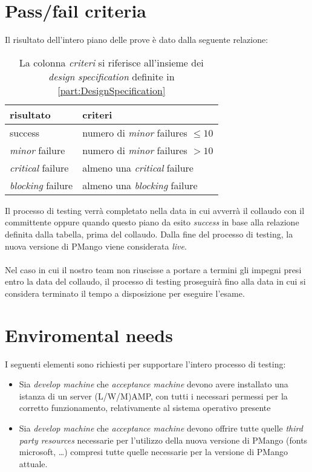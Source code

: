 \section{Pass/fail criteria}
Il risultato dell'intero piano delle prove \`e dato dalla seguente relazione:
\begin{table}[h!]
  \begin{center}
    \begin{tabular}{| l | l |}
    \hline
    \textbf{risultato} & \textbf{criteri} \\
	\hline    
	success & numero di \emph{minor} failures $\leq 10$   \\
    \hline
    \emph{minor} failure & numero di \emph{minor} failures $> 10$ \\
    \hline
    \emph{critical} failure & almeno una \emph{critical} failure \\
    \hline
    \emph{blocking} failure & almeno una \emph{blocking} failure \\
    \hline
    \end{tabular}
  \end{center}
	\caption{La colonna \emph{criteri} si riferisce all'insieme dei \emph{design
	specification} definite in \ref{part:DesignSpecification}}
\end{table}

Il processo di testing verr\`a completato nella data in cui avverr\`a il
collaudo con il committente oppure quando questo piano da esito
\emph{success} in base alla relazione definita dalla tabella, prima del
collaudo. Dalla fine del processo di testing, la nuova versione di PMango
viene considerata \emph{live}. \\ \\ 
Nel caso in cui il nostro team non riuscisse a portare a termini gli impegni 
presi entro la data del collaudo, il processo di testing proseguir\`a fino alla
data in cui si considera terminato il tempo a disposizione per eseguire l'esame.

\section{Enviromental needs}
I seguenti elementi sono richiesti per supportare l'intero processo di testing:
\begin{itemize}
  \item Sia \emph{develop machine} che \emph{acceptance machine} devono avere
  installato una istanza di un server (L/W/M)AMP, con tutti i necessari permessi
  per la corretto funzionamento, relativamente al sistema operativo presente
  \item Sia \emph{develop machine} che \emph{acceptance machine} devono offrire
  tutte quelle \emph{third party resources} necessarie per l'utilizzo della
  nuova versione di PMango (fonts microsoft, \ldots) compresi tutte quelle
  necessarie per la versione di PMango attuale.
\end{itemize}
